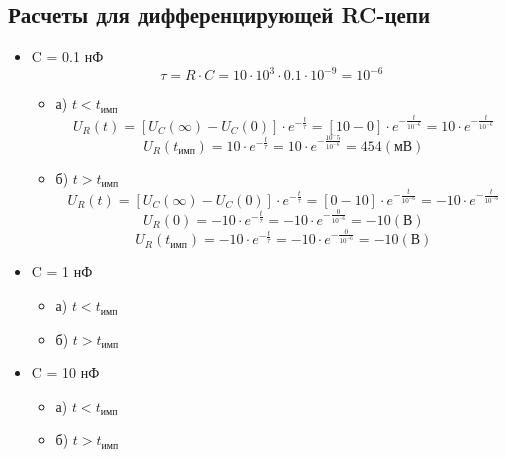 \subsection{Расчеты для дифференцирующей RC-цепи}
\begin{itemize}
\item C = 0.1 нФ\\
\begin{equation}
		\tau = R \cdot C = 10 \cdot 10^3 \cdot 0.1 \cdot 10^{-9} = 10^{-6}
	\end{equation}
\begin{itemize}
\item[] а) $t < t_\text{имп}$\\
	\begin{equation}
		U_R(t) = [U_C(\infty) - U_C(0)] \cdot e^{-\frac{t}{\tau}} = [10 - 0] \cdot e^{-\frac{t}{10^{-6}}} = 10 \cdot e^{-\frac{t}{10^{-6}}}
	\end{equation}
	\begin{equation}
		U_R(t_\text{имп}) = 10 \cdot e^{-\frac{t}{\tau}} = 10 \cdot e^{-\frac{10^-5}{10^{-6}}} = 454 (\text{мВ})
	\end{equation}
	
\item[] б) $t > t_\text{имп}$\\
	\begin{equation}
		U_R(t) = [U_C(\infty) - U_C(0)] \cdot e^{-\frac{t}{\tau}} = [0 - 10] \cdot e^{-\frac{t}{10^{-6}}} = -10 \cdot e^{-\frac{t}{10^{-6}}}
	\end{equation}
	\begin{equation}
		U_R(0) = -10 \cdot e^{-\frac{t}{\tau}} = -10 \cdot e^{-\frac{0}{10^{-6}}} = -10 (\text{В})
	\end{equation}
	\begin{equation}
		U_R(t_\text{имп}) = -10 \cdot e^{-\frac{t}{\tau}} = -10 \cdot e^{-\frac{0}{10^{-6}}} = -10 (\text{В})
	\end{equation}
\end{itemize}

\item C = 1 нФ\\
\begin{itemize}
\item[] а) $t < t_\text{имп}$\\

\item[] б) $t > t_\text{имп}$\\

\end{itemize}

\item C = 10 нФ\\
\begin{itemize}
\item[] а) $t < t_\text{имп}$\\

\item[] б) $t > t_\text{имп}$\\

\end{itemize}
\end{itemize}

